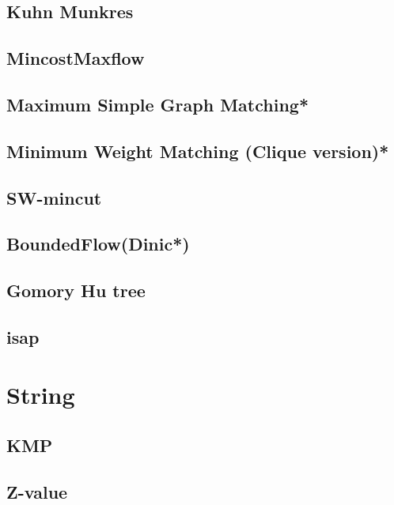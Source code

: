 \subsection{Kuhn Munkres}

\subsection{MincostMaxflow}

\subsection{Maximum Simple Graph Matching*} %

\subsection{Minimum Weight Matching (Clique version)*} %

\subsection{SW-mincut}

\subsection{BoundedFlow(Dinic*)} %

\subsection{Gomory Hu tree}

 \subsection{isap}
 


\section{String}
\subsection{KMP}

\subsection{Z-value}

